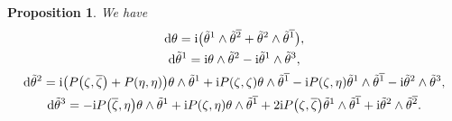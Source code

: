 \documentclass[11pt]{article}
\numberwithin{equation}{section}
\newcommand\ol{\overline}
\numberwithin{equation}{section}
\newtheorem{Proposition}[Theorem]{Proposition}
 { \theoremstyle{definition}
\newtheorem{Definition}[Theorem]{Definition}
\newtheorem*{Notation}{Notation}
\newtheorem{Example}[Theorem]{Example}
\newtheorem{Remark}[Theorem]{Remark} }
\begin{document}
\begin{Proposition} We have
\begin{gather}
{\rm d}\theta={\rm i}\bigl(\tilde\theta^1\wedge\tilde\theta^{\ol2}+\tilde\theta^2\wedge\tilde\theta^{\ol1}\bigr), \nonumber\\
{\rm d}\tilde\theta^1={\rm i}\theta\wedge\tilde\theta^2-{\rm i}\tilde\theta^1\wedge\tilde\theta^3, \nonumber\\
{\rm d}\tilde\theta^2={\rm i}\bigl(P\bigl(\zeta, \ol\zeta\bigr)+P(\eta, \eta)\bigr)\theta\wedge\tilde\theta^1+{\rm i}P(\zeta, \zeta)\theta\wedge\tilde\theta^{\ol1}
- {\rm i}P(\zeta, \eta)\tilde\theta^1\wedge\tilde\theta^{\ol1}-{\rm i}\tilde\theta^2\wedge\tilde\theta^3, \nonumber\\
{\rm d}\tilde\theta^3=- {\rm i}P\bigl(\ol\zeta, \eta\bigr)\theta\wedge\tilde\theta^1+{\rm i}
P(\zeta, \eta)\theta\wedge\tilde\theta^{\ol1}
+ 2{\rm i}P\bigl(\zeta, \ol\zeta\bigr)\tilde\theta^1\wedge\tilde\theta^{\ol1}+{\rm i}\tilde\theta^2\wedge\tilde\theta^{\ol2}.\label{diff-coframe}
\end{gather}
\end{Proposition}
\end{document}
